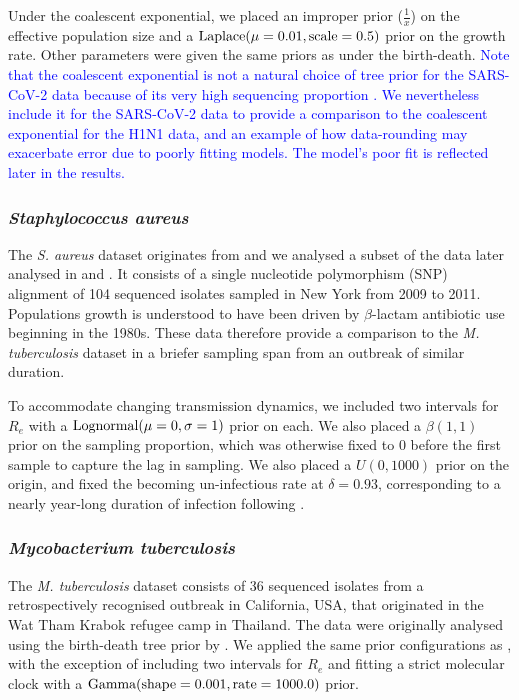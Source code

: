 \documentclass[12pt]{article}
\begin{document}
\begin{spacing}{2}
Under the coalescent exponential, we placed an improper prior ($\frac{1}{x}$) on the effective population size and a $\textnormal{Laplace}(\mu=0.01,\textnormal{scale}=0.5)$ prior on the growth rate. Other parameters were given the same priors as under the birth-death. \textcolor{blue}{Note that the coalescent exponential is not a natural choice of tree prior for the SARS-CoV-2 data because of its very high sequencing proportion \citep{stadler_how_2015}. We nevertheless include it for the SARS-CoV-2 data to provide a comparison to the coalescent exponential for the H1N1 data, and an example of how data-rounding may exacerbate error due to poorly fitting models. The model's poor fit is reflected later in the results.}

\subsubsection*{\textit{Staphylococcus aureus}}
The \textit{S. aureus} dataset originates from \citet{uhlemann_molecular_2014} and we analysed a subset of the data later analysed in \citet{duchene_2016_genome} and \citet{volz_modeling_2018}. It consists of a single nucleotide polymorphism (SNP) alignment of 104 sequenced isolates sampled in New York from 2009 to 2011. Populations growth is understood to have been driven by $\beta$-lactam antibiotic use beginning in the 1980s. These data therefore provide a comparison to the \textit{M. tuberculosis} dataset in a briefer sampling span from an outbreak of similar duration.

To accommodate changing transmission dynamics, we included two intervals for $R_e$ with a $\textnormal{Lognormal}(\mu=0,\sigma=1)$ prior on each. We also placed a $\beta(1,1)$ prior on the sampling proportion, which was otherwise fixed to 0 before the first sample to capture the lag in sampling. We also placed a $U(0,1000)$ prior on the origin, and fixed the becoming un-infectious rate at $\delta=0.93$, corresponding to a nearly year-long duration of infection following \citet{volz_modeling_2018}.

\subsubsection*{\textit{Mycobacterium tuberculosis}}
The \textit{M. tuberculosis} dataset consists of 36 sequenced isolates from a retrospectively recognised outbreak in California, USA, that originated in the Wat Tham Krabok refugee camp in Thailand. The data were originally analysed using the birth-death tree prior by \citet{kuhnert_tuberculosis_2018}. We applied the same prior configurations as \citet{kuhnert_tuberculosis_2018}, with the exception of including two intervals for $R_e$ and fitting a strict molecular clock with a $\textnormal{Gamma}(\textnormal{shape}=0.001,\textnormal{rate}=1000.0)$ prior.


\end{spacing}
\end{document}
